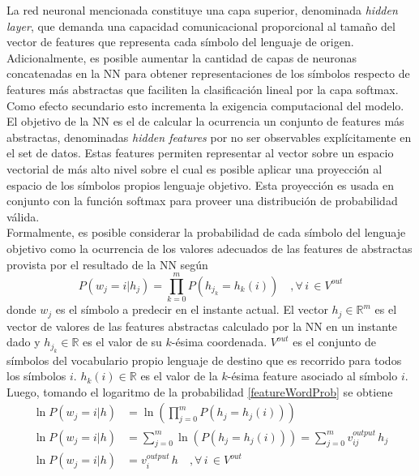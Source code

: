 \documentclass{article}
\begin{document}
	La red neuronal mencionada constituye una capa superior, denominada \textit{hidden layer}, que demanda una capacidad comunicacional proporcional al tamaño del vector de features que representa cada símbolo del lenguaje de origen.\\
	Adicionalmente, es posible aumentar la cantidad de capas de neuronas concatenadas en la NN para obtener representaciones de los símbolos respecto de features más abstractas que faciliten la clasificación lineal por la capa softmax. Como efecto secundario esto incrementa la exigencia computacional del modelo.\\
	El objetivo de la NN es el de calcular la ocurrencia un conjunto de features más abstractas, denominadas \textit{hidden features} por no ser observables explícitamente en el set de datos. Estas features permiten representar al vector sobre un espacio vectorial de más alto nivel sobre el cual es posible aplicar una proyección al espacio de los símbolos propios lenguaje objetivo. Esta proyección es usada en conjunto con la función softmax para proveer una distribución de probabilidad válida.\\
	Formalmente, es posible considerar la probabilidad de cada símbolo del lenguaje objetivo como la ocurrencia de los valores adecuados de las features de abstractas provista por el resultado de la NN según
	\begin{equation}\label{featureWordProb}
	P(w_j = i | h_j) = \prod_{k=0}^{m}P(h_{j_k} = h_k(i)) \quad , \forall \, i \, \in V^{out}
	\end{equation}
	donde $w_j$ es el símbolo a predecir en el instante actual. El vector $h_j \in \mathbb{R}^m$ es el vector de valores de las features abstractas calculado por la NN en un instante dado y $h_{j_k} \in \mathbb{R}$ es el valor de su $k$-ésima coordenada. $V^{out}$ es el conjunto de símbolos del vocabulario propio lenguaje de destino que es recorrido para todos los símbolos $i$. $h_k(i) \in \mathbb{R}$ es el valor de la $k$-ésima feature asociado al símbolo $i$.\\
	Luego, tomando el logaritmo de la probabilidad \ref{featureWordProb} se obtiene
	\begin{equation*}
	\begin{split}
	\ln P(w_j = i | h) &= \ln (\prod_{j=0}^{m}P(h_{j} = h_j(i))) \\
	\ln P(w_j = i | h) &= \sum_{j=0}^{m} \ln (P(h_{j} = h_j(i))) = \sum_{j=0}^{m} v^{output}_{ij} \, h_{j} \\
	\ln P(w_j = i | h) &= v^{output}_i \, h  \quad , \forall \,i \, \in V^{out}\\
	\end{split}
	\end{equation*}
\end{document}

